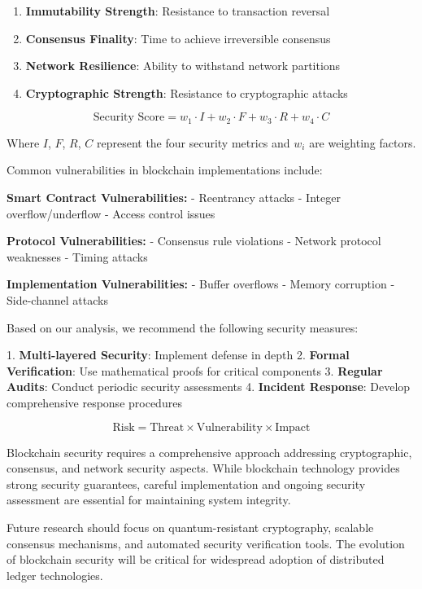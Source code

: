 \documentclass{article}
\begin{document}
\begin{enumerate}
\item \textbf{Immutability Strength}: Resistance to transaction reversal
\item \textbf{Consensus Finality}: Time to achieve irreversible consensus
\item \textbf{Network Resilience}: Ability to withstand network partitions
\item \textbf{Cryptographic Strength}: Resistance to cryptographic attacks
\end{enumerate}

\begin{equation}
\text{Security Score} = w_1 \cdot I + w_2 \cdot F + w_3 \cdot R + w_4 \cdot C
\end{equation}

Where $I$, $F$, $R$, $C$ represent the four security metrics and $w_i$ are weighting factors.

Common vulnerabilities in blockchain implementations include:

\textbf{Smart Contract Vulnerabilities:}
- Reentrancy attacks
- Integer overflow/underflow
- Access control issues

\textbf{Protocol Vulnerabilities:}
- Consensus rule violations
- Network protocol weaknesses
- Timing attacks

\textbf{Implementation Vulnerabilities:}
- Buffer overflows
- Memory corruption
- Side-channel attacks

Based on our analysis, we recommend the following security measures:

1. \textbf{Multi-layered Security}: Implement defense in depth
2. \textbf{Formal Verification}: Use mathematical proofs for critical components
3. \textbf{Regular Audits}: Conduct periodic security assessments
4. \textbf{Incident Response}: Develop comprehensive response procedures

\begin{equation}
\text{Risk} = \text{Threat} \times \text{Vulnerability} \times \text{Impact}
\end{equation}

Blockchain security requires a comprehensive approach addressing cryptographic, consensus, and network security aspects. While blockchain technology provides strong security guarantees, careful implementation and ongoing security assessment are essential for maintaining system integrity.

Future research should focus on quantum-resistant cryptography, scalable consensus mechanisms, and automated security verification tools. The evolution of blockchain security will be critical for widespread adoption of distributed ledger technologies.
\end{document}
